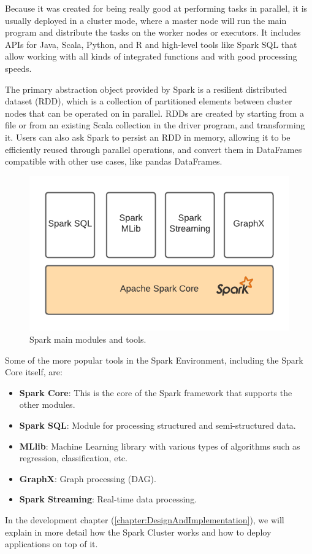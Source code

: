 Because it was created for being really good at performing tasks in parallel, it is usually deployed in a cluster mode, where a master node will run the main program and distribute the tasks on the worker nodes or executors. It includes APIs for Java, Scala, Python, and R and high-level tools like Spark SQL that allow working with all kinds of integrated functions and with good processing speeds.

The primary abstraction object provided by Spark is a resilient distributed dataset (RDD), which is a collection of partitioned elements between cluster nodes that can be operated on in parallel. RDDs are created by starting from a file or from an existing Scala collection in the driver program, and transforming it. Users can also ask Spark to persist an RDD in memory, allowing it to be efficiently reused through parallel operations, and convert them in DataFrames compatible with other use cases, like pandas DataFrames.

\begin{figure}[H]
	\centering
	\includegraphics[width=1\linewidth]{imagenes/spark-core.png}
	\caption{Spark main modules and tools.}
	\label{spark-core}
\end{figure}

Some of the more popular tools in the Spark Environment, including the Spark Core itself, are:


\begin{itemize}
	\item \textbf{Spark Core}: This is the core of the Spark framework that supports the other modules.
	\item \textbf{Spark SQL}: Module for processing structured and semi-structured data.
	\item \textbf{MLlib}: Machine Learning library with various types of algorithms such as regression, classification, etc.
	\item \textbf{GraphX}: Graph processing (DAG).
	\item \textbf{Spark Streaming}: Real-time data processing.
\end{itemize}

In the development chapter (\ref{chapter:DesignAndImplementation}), we will explain in more detail how the Spark Cluster works and how to deploy applications on top of it.